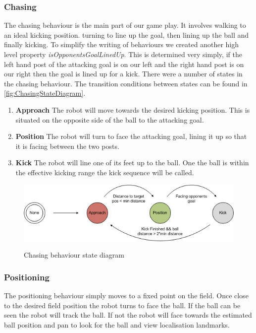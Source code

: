 \subsubsection{Chasing}
The chasing behaviour is the main part of our game play. It involves walking to an ideal kicking position. turning to line up the goal, then lining up the ball and finally kicking. To simplify the writing of behaviours we created another high level property \emph{isOpponentsGoalLinedUp}. This is determined very simply, if the left hand post of the attacking goal is on our left and the right hand post is on our right then the goal is lined up for a kick. There were a number of states in the chasing behaviour. The transition conditions between states can be found in \autoref{fig:ChasingStateDiagram}.
\begin{enumerate}
\item \textbf{Approach} The robot will move towards the desired kicking position. This is situated on the opposite side of the ball to the attacking goal.
\item \textbf{Position} The robot will turn to face the attacking goal, lining it up so that it is facing between the two posts.
\item \textbf{Kick} The robot will line one of its feet up to the ball. One the ball is within the effective kicking range the kick sequence will be called.
\end{enumerate}

\begin{figure}[htpb]
\begin{center}
   \leavevmode
    \scalebox{0.8} {\includegraphics{figs/FieldPlayerChasingStates.jpg} }
    \caption{Chasing behaviour state diagram}
    \label{fig:ChasingStateDiagram}
\end{center}
\end{figure}

\subsubsection{Positioning}
The positioning behaviour simply moves to a fixed point on the field. Once close to the desired field position the robot turns to face the ball. If the ball can be seen the robot will track the ball. If not the robot will face towards the estimated ball position and pan to look for the ball and view localisation landmarks.


